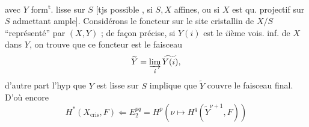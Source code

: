 avec $Y$ form\textsuperscript{t}. lisse sur $S$ [tjs possible ,  si $S,X$ affines, ou si $X$ est qu. projectif sur $S$  admettant  ample]. Considérons le foncteur sur le site cristallin de $X/S$ ``représenté'' par $(X,Y)$ ; de façon précise, si $Y(i)$ est le $i$ième vois. inf. de $X$ dans $Y$, on trouve que ce foncteur est le faisceau
\[
\widetilde Y=\varinjlim_i\widetilde{Y(i)},
\]
d'autre part l'hyp que $Y$ est  lisse sur $S$ implique que $\widetilde Y$ couvre le faisceau final. D'où encore
\[
H^*(X_{\mathrm{cris}},F)\Longleftarrow E_2^{pq}=H^p(\nu\longmapsto H^q(\widetilde Y^{\nu+1},F))
\]
